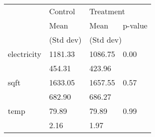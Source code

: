 \begin{tabular}{llll}
\toprule
{} &   Control & \multicolumn{2}{l}{Treatment} \\
{} &      Mean &      Mean & p-value \\
{} & (Std dev) & \multicolumn{2}{l}{(Std dev)} \\
\midrule
electricity &   1181.33 &   1086.75 &    0.00 \\
            &    454.31 &    423.96 &         \\
sqft        &   1633.05 &   1657.55 &    0.57 \\
            &    682.90 &    686.27 &         \\
temp        &     79.89 &     79.89 &    0.99 \\
            &      2.16 &      1.97 &         \\
\bottomrule
\end{tabular}
